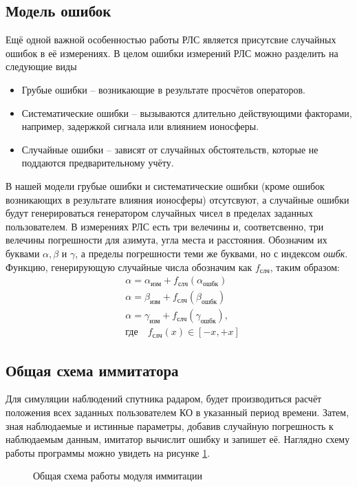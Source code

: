 \subsection{Модель ошибок}

Ещё одной важной особенностью работы РЛС является присутсвие случайных ошибок в её измерениях. В целом ошибки
измерений РЛС можно разделить на следующие виды\cite{Bakulev}
\begin{itemize}
	\item Грубые ошибки -- возникающие в результате просчётов операторов.
	\item Систематические ошибки -- вызываются длительно действующими факторами, например, задержкой сигнала или 
		влиянием ионосферы.
	\item Случайные ошибки -- зависят от случайных обстоятельств, которые не поддаются предварительному учёту.
\end{itemize}

В нашей модели грубые ошибки и систематические ошибки (кроме ошибок возникающих в результате влияния ионосферы)
отсутсвуют, а случайные ошибки будут генерироваться генератором случайных чисел в пределах заданных пользователем.
В измерениях РЛС есть три велечины и, соответсвенно, три велечины погрешности для азимута, угла места и расстояния.
Обозначим их буквами $\alpha, \beta$ и $\gamma$, а пределы погрешности теми же буквами, но с индексом
\textit{ошбк}. Функцию, генерирующую случайные числа обозначим как $f_{\text{слч}}$, таким образом:
\begin{equation}
	\begin{aligned}
		& \alpha = \alpha_{\text{изм}} + f_{\text{слч}}(\alpha_{\text{ошбк}}) \\
		& \alpha = \beta_{\text{изм}} + f_{\text{слч}}(\beta_{\text{ошбк}}) \\
		& \alpha = \gamma_{\text{изм}} + f_{\text{слч}}(\gamma_{\text{ошбк}}), \\
		& \text{где} \quad f_{\text{слч}}(x) \in [-x, +x]
	\end{aligned}
\end{equation}

\subsection{Общая схема иммитатора}

Для симуляции наблюдений спутника радаром, будет производиться расчёт положения всех заданных пользователем КО в
указанный период времени. Затем, зная наблюдаемые и истинные параметры, добавив случайную погрешность к наблюдаемым
данным, имитатор вычислит ошибку и запишет её. Наглядно схему работы программы можно увидеть на 
рисунке \ref{common-immitation-scheme}.
\begin{figure}[h] 
	\centering
	
	\caption{Общая схема работы модуля иммитации} \label{common-immitation-scheme}
\end{figure}

